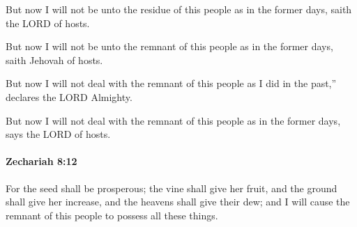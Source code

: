 			But now I will not be unto the residue of this people as in the former days, saith the LORD of hosts.

			\begin{versebox}
					\item[BHS] 
					\item[LXX] 
					\item[ASV] But now I will not be unto the remnant of this people as in the former days, saith Jehovah of hosts.
					\item[NIV] But now I will not deal with the remnant of this people as I did in the past,” declares the LORD Almighty.
					\item[NRSV] But now I will not deal with the remnant of this people as in the former days, says the LORD of hosts.
			\end{versebox}

		\paragraph{Zechariah 8:12} %
			\label{ZECHARIAH-8-12}

			For the seed shall be prosperous; the vine shall give her fruit, and the ground shall give her increase, and the heavens shall give their dew; and I will cause the remnant of this people to possess all these things.

